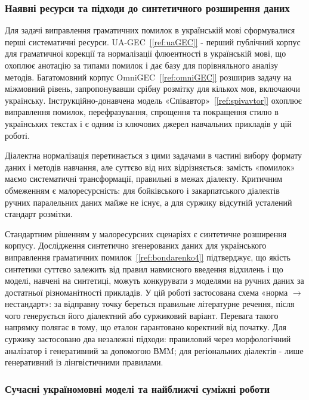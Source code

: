 \documentclass[14pt]{extarticle}
\newcommand{\citeref}[1]{\hyperref[#1]{[\ref*{#1}]}}
\begin{document}
\subsubsection{Наявні ресурси та підходи до синтетичного розширення даних}

Для задачі виправлення граматичних помилок в українській мові сформувалися перші систематичні ресурси. UA-GEC~\citeref{ref:uaGEC} - перший публічний корпус для граматичної корекції та нормалізації флюентності в українській мові, що охоплює анотацію за типами помилок і дає базу для порівняльного аналізу методів. Багатомовний корпус OmniGEC~\citeref{ref:omniGEC} розширив задачу на міжмовний рівень, запропонувавши срібну розмітку для кількох мов, включаючи українську. Інструкційно-донавчена модель «Співавтор»~\citeref{ref:spivavtor} охоплює виправлення помилок, перефразування, спрощення та покращення стилю в українських текстах і є одним із ключових джерел навчальних прикладів у цій роботі.

Діалектна нормалізація перетинається з цими задачами в частині вибору формату даних і методів навчання, але суттєво від них відрізняється: замість «помилок» маємо систематичні трансформації, правильні в межах діалекту. Критичним обмеженням є малоресурсність: для бойківського і закарпатського діалектів ручних паралельних даних майже не існує, а для суржику відсутній усталений стандарт розмітки.

Стандартним рішенням у малоресурсних сценаріях є синтетичне розширення корпусу. Дослідження синтетично згенерованих даних для українського виправлення граматичних помилок~\citeref{ref:bondarenko4} підтверджує, що якість синтетики суттєво залежить від правил навмисного введення відхилень і що моделі, навчені на синтетиці, можуть конкурувати з моделями на ручних даних за достатньої різноманітності прикладів. У цій роботі застосована схема «норма $\to$ нестандарт»: за відправну точку береться правильне літературне речення, після чого генерується його діалектний або суржиковий варіант. Перевага такого напрямку полягає в тому, що еталон гарантовано коректний від початку. Для суржику застосовано два незалежні підходи: правиловий через морфологічний аналізатор і генеративний за допомогою ВМM; для регіональних діалектів - лише генеративний із лінгвістичними правилами.

\subsubsection{Сучасні україномовні моделі та найближчі суміжні роботи}
\end{document}
